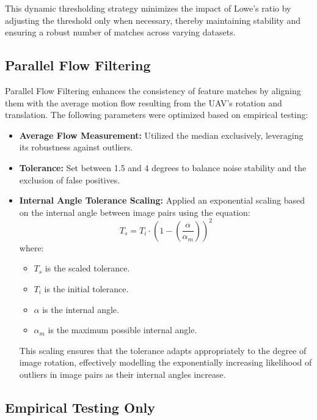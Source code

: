This dynamic thresholding strategy minimizes the impact of Lowe's ratio by adjusting the threshold only when necessary, thereby maintaining stability and ensuring a robust number of matches across varying datasets.

\subsection{Parallel Flow Filtering}

Parallel Flow Filtering enhances the consistency of feature matches by aligning them with the average motion flow resulting from the UAV's rotation and translation. The following parameters were optimized based on empirical testing:

\begin{itemize}
    \item \textbf{Average Flow Measurement:} Utilized the median exclusively, leveraging its robustness against outliers.
    \item \textbf{Tolerance:} Set between 1.5 and 4 degrees to balance noise stability and the exclusion of false positives.
    \item \textbf{Internal Angle Tolerance Scaling:} Applied an exponential scaling based on the internal angle between image pairs using the equation:
    \begin{equation*}
        T_s = T_i \cdot \left(1 - \left(\frac{\alpha}{\alpha_m}\right)\right)^2
    \end{equation*}
    where:
    \begin{itemize}
        \item $T_s$ is the scaled tolerance.
        \item $T_i$ is the initial tolerance.
        \item $\alpha$ is the internal angle.
        \item $\alpha_m$ is the maximum possible internal angle.
    \end{itemize}
    This scaling ensures that the tolerance adapts appropriately to the degree of image rotation, effectively modelling the exponentially increasing likelihood of outliers in image pairs as their internal angles increase.
\end{itemize}

\subsection*{\textbf{Empirical Testing Only}}

